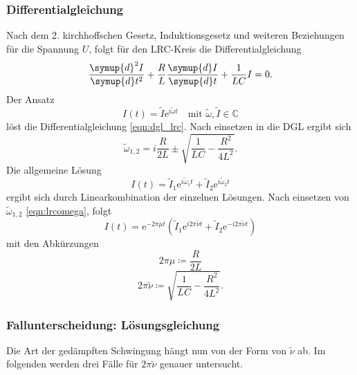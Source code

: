 \subsubsection{Differentialgleichung}
Nach dem 2. kirchhoffschen Gesetz, Induktionsgesetz und weiteren Beziehungen für die Spannung $U$, folgt für den LRC-Kreis die Differentialgleichung
\begin{equation}
    \frac{\symup{d}^2I}{\symup{d}t^2} + \frac{R}{L} \frac{\symup{d}I}{\symup{d}t} + \frac{1}{LC} I = 0 .
    \label{eqn:dgl_lrc}
\end{equation}
Der Ansatz
\begin{equation*}
    I(t) = \tilde{I} \mathrm{e}^{i\tilde{\omega} t} \quad \text{mit } \tilde{\omega}, \tilde{I} \in \mathbb{C}
\end{equation*}
löst die Differentialgleichung \autoref{eqn:dgl_lrc}.
Nach einsetzen in die DGL ergibt sich
\begin{equation}
    \tilde{\omega}_{1,2} = i \frac{R}{2L} \pm \sqrt{\frac{1}{LC} - \frac{R^2}{4L^2}} .
    \label{eqn:lrcomega}
\end{equation}
Die allgemeine Lösung
\begin{equation*}
    I(t) = \tilde{I}_1 \mathrm{e}^{i\tilde{\omega}_1 t} + \tilde{I}_2 \mathrm{e}^{i\tilde{\omega}_2 t}
\end{equation*}
ergibt sich durch Linearkombination der einzelnen Lösungen.
Nach einsetzen von $\tilde{\omega}_{1,2}$ \autoref{eqn:lrcomega}, folgt
\begin{equation}
    I(t) = \mathrm{e}^{-2 \pi \mu t} \left ( \tilde{I}_1 \mathrm{e}^{i 2\pi \tilde{\nu} t} + \tilde{I}_2 \mathrm{e}^{-i 2\pi \tilde{\nu} t} \right)
    \label{eqn:dgl_loesung}
\end{equation}
mit den Abkürzungen
\begin{equation}
    2\pi\mu \coloneqq \frac{R}{2L}
    \label{eqn:mu}
\end{equation}
\begin{equation*}
    2\pi\tilde{\nu} \coloneqq \sqrt{\frac{1}{LC} - \frac{R^2}{4L^2}} .
\end{equation*}

\subsubsection{Fallunterscheidung: Lösungsgleichung}
Die Art der gedämpften Schwingung hängt nun von der Form von $\tilde{\nu}$ ab.
Im folgenden werden drei Fälle für $2\pi\tilde{\nu}$ genauer untersucht.\\
\\

